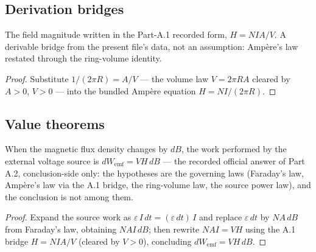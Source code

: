 \subsection*{Derivation bridges}

\begin{lemma}
\label{lem:IPhO2026Problems_problem_IPhO_2026_3_A_2:fieldStrength_eq_N_mul_I_mul_A_div_V}
The field magnitude written in the Part-A.1 recorded form,
$H = N I A / V$.  A derivable bridge from the present file's data, not an
assumption: Ampère's law restated through the ring-volume identity.
\end{lemma}
\begin{proof}
Substitute $1/(2\pi R) = A/V$ — the volume law $V = 2\pi R A$ cleared by
$A > 0$, $V > 0$ — into the bundled Ampère equation $H = N I/(2\pi R)$.
\end{proof}

\subsection*{Value theorems}

\begin{theorem}[A.2 target: source work $dW_{\mathrm{emf}} = V H\,dB$]
\label{thm:IPhO2026Problems_problem_IPhO_2026_3_A_2:work_emf_eq_V_mul_H_mul_dB}
When the magnetic flux density changes by $dB$, the work performed by the
external voltage source is $dW_{\mathrm{emf}} = V H\,dB$ — the recorded
official answer of Part A.2, conclusion-side only: the hypotheses are the
governing laws (Faraday's law, Ampère's law via the A.1 bridge, the
ring-volume law, the source power law), and the conclusion is not among them.
\end{theorem}
\begin{proof}
Expand the source work as $\varepsilon\,I\,dt = (\varepsilon\,dt)\,I$ and
replace $\varepsilon\,dt$ by $N A\,dB$ from Faraday's law, obtaining
$N A I\,dB$; then rewrite $N A I = V H$ using the A.1 bridge
$H = N I A / V$ (cleared by $V > 0$), concluding $dW_{\mathrm{emf}} = V H\,dB$.
\end{proof}
